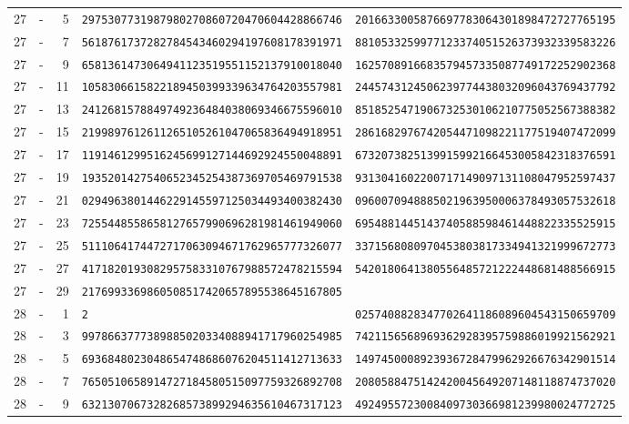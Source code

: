 \begin{longtable}{@{}rcrll@{}}
27&-&5&\texttt{2975307731987980270860720470604428866746}&\texttt{2016633005876697783064301898472727765195}\\
27&-&7&\texttt{5618761737282784543460294197608178391971}&\texttt{8810533259977123374051526373932339583226}\\
27&-&9&\texttt{6581361473064941123519551152137910018040}&\texttt{1625708916683579457335087749172252902368}\\
27&-&11&\texttt{1058306615822189450399339634764203557981}&\texttt{2445743124506239774438032096043769437792}\\
27&-&13&\texttt{2412681578849749236484038069346675596010}&\texttt{8518525471906732530106210775052567388382}\\
27&-&15&\texttt{2199897612611265105261047065836494918951}&\texttt{2861682976742054471098221177519407472099}\\
27&-&17&\texttt{1191461299516245699127144692924550048891}&\texttt{6732073825139915992166453005842318376591}\\
27&-&19&\texttt{1935201427540652345254387369705469791538}&\texttt{9313041602200717149097131108047952597437}\\
27&-&21&\texttt{0294963801446229145597125034493400382430}&\texttt{0960070948885021963950006378493057532618}\\
27&-&23&\texttt{7255448558658127657990696281981461949060}&\texttt{6954881445143740588598461448822335525915}\\
27&-&25&\texttt{5111064174472717063094671762965777326077}&\texttt{3371568080970453803817334941321999672773}\\
27&-&27&\texttt{4171820193082957583310767988572478215594}&\texttt{5420180641380556485721222448681488566915}\\
27&-&29&\texttt{2176993369860508517420657895538645167805}&\texttt{}\\
28&-&1&\texttt{2}&\texttt{0257408828347702641186089604543150659709}\\
28&-&3&\texttt{9978663777389885020334088941717960254985}&\texttt{7421156568969362928395759886019921562921}\\
28&-&5&\texttt{6936848023048654748686076204511412713633}&\texttt{1497450008923936728479962926676342901514}\\
28&-&7&\texttt{7650510658914727184580515097759326892708}&\texttt{2080588475142420045649207148118874737020}\\
28&-&9&\texttt{6321307067328268573899294635610467317123}&\texttt{4924955723008409730366981239980024772725}\\

\end{longtable}
